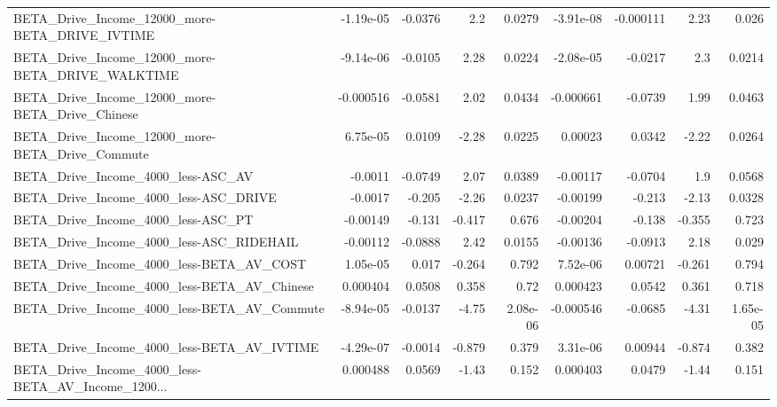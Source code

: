 \begin{tabular}{lrrrrrrrr}
BETA\_Drive\_Income\_12000\_more-BETA\_DRIVE\_IVTIME     &   -1.19e-05 &      -0.0376 &       2.2 &   0.0279 &  -3.91e-08 &   -0.000111 &         2.23 &         0.026 \\
BETA\_Drive\_Income\_12000\_more-BETA\_DRIVE\_WALKTIME   &   -9.14e-06 &      -0.0105 &      2.28 &   0.0224 &  -2.08e-05 &     -0.0217 &          2.3 &        0.0214 \\
BETA\_Drive\_Income\_12000\_more-BETA\_Drive\_Chinese    &   -0.000516 &      -0.0581 &      2.02 &   0.0434 &  -0.000661 &     -0.0739 &         1.99 &        0.0463 \\
BETA\_Drive\_Income\_12000\_more-BETA\_Drive\_Commute    &    6.75e-05 &       0.0109 &     -2.28 &   0.0225 &    0.00023 &      0.0342 &        -2.22 &        0.0264 \\
BETA\_Drive\_Income\_4000\_less-ASC\_AV                 &     -0.0011 &      -0.0749 &      2.07 &   0.0389 &   -0.00117 &     -0.0704 &          1.9 &        0.0568 \\
BETA\_Drive\_Income\_4000\_less-ASC\_DRIVE              &     -0.0017 &       -0.205 &     -2.26 &   0.0237 &   -0.00199 &      -0.213 &        -2.13 &        0.0328 \\
BETA\_Drive\_Income\_4000\_less-ASC\_PT                 &    -0.00149 &       -0.131 &    -0.417 &    0.676 &   -0.00204 &      -0.138 &       -0.355 &         0.723 \\
BETA\_Drive\_Income\_4000\_less-ASC\_RIDEHAIL           &    -0.00112 &      -0.0888 &      2.42 &   0.0155 &   -0.00136 &     -0.0913 &         2.18 &         0.029 \\
BETA\_Drive\_Income\_4000\_less-BETA\_AV\_COST           &    1.05e-05 &        0.017 &    -0.264 &    0.792 &   7.52e-06 &     0.00721 &       -0.261 &         0.794 \\
BETA\_Drive\_Income\_4000\_less-BETA\_AV\_Chinese        &    0.000404 &       0.0508 &     0.358 &     0.72 &   0.000423 &      0.0542 &        0.361 &         0.718 \\
BETA\_Drive\_Income\_4000\_less-BETA\_AV\_Commute        &   -8.94e-05 &      -0.0137 &     -4.75 & 2.08e-06 &  -0.000546 &     -0.0685 &        -4.31 &      1.65e-05 \\
BETA\_Drive\_Income\_4000\_less-BETA\_AV\_IVTIME         &   -4.29e-07 &      -0.0014 &    -0.879 &    0.379 &   3.31e-06 &     0.00944 &       -0.874 &         0.382 \\
BETA\_Drive\_Income\_4000\_less-BETA\_AV\_Income\_1200... &    0.000488 &       0.0569 &     -1.43 &    0.152 &   0.000403 &      0.0479 &        -1.44 &         0.151 \\

\end{tabular}
